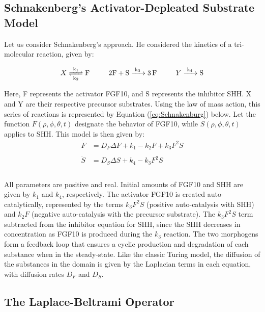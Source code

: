 \documentclass[12pt]{article}
\begin{document}
\subsection{Schnakenberg's Activator-Depleated Substrate Model}\label{schnakenberg}

Let us consider Schnakenberg's approach. He considered the kinetics of a tri-molecular reaction, given by:

$$ X\ce{ <=>[k_1][k_2] F} ~~~~~~~~ \text{2F}+\ce{S ->[k_3] 3F} ~~~~~~~~ Y\ce{->[k_4] S} $$

\noindent Here, F represents the activator FGF10, and S represents the inhibitor SHH. X and Y are their respective precursor substrates. Using the law of mass action, this series of reactions is represented by Equation (\ref{eq:Schnakenburg}) below. Let the function $F(\rho,\phi,\theta,t)$ designate the behavior of FGF10, while $S(\rho,\phi,\theta,t)$ applies to SHH. This model is then given by:
\\
\begin{equation}
\label{eq:Schnakenburg}
    \begin{aligned}
    \dot{F} & = D_F\Delta F + k_1 - k_2F + k_3F^2S \\
    \\
    \dot{S} & = D_S\Delta S + k_4 - k_3F^2S \\
    \end{aligned}
\end{equation}
\\
\noindent All parameters are positive and real. Initial amounts of FGF10 and SHH are given by $k_1$ and $k_4$, respectively. The activator FGF10 is created auto-catalytically, represented by the terms $k_3F^2S$ (positive auto-catalysis with SHH) and $k_2F$ (negative auto-catalysis with the precursor substrate). The $k_3F^2S$ term subtracted from the inhibitor equation for SHH, since the SHH decreases in concentration as FGF10 is produced during the $k_3$ reaction. The two morphogens form a feedback loop that ensures a cyclic production and degradation of each substance when in the steady-state. Like the classic Turing model, the diffusion of the substances in the domain is given by the Laplacian terms in each equation, with diffusion rates $D_F$ and $D_S$.

\subsection{The Laplace-Beltrami Operator}\label{laplace-beltrami}
\end{document}
